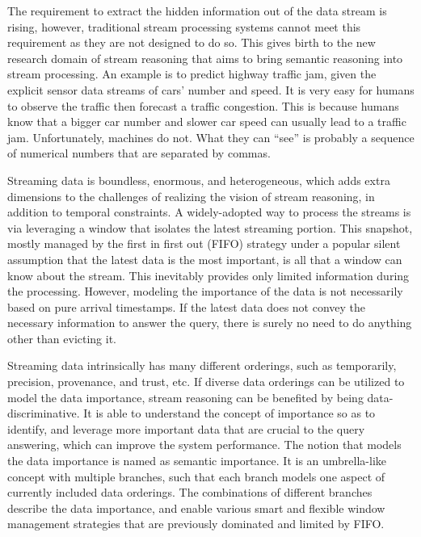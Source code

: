  
The requirement to extract the hidden information out of the data stream is rising, 
however, traditional stream processing systems cannot meet this requirement as they are not designed to do so.  
This gives birth to the new research domain of stream reasoning that aims to bring semantic reasoning into stream processing.
An example is to predict highway traffic jam, given the explicit sensor data streams of cars' number and speed.
It is very easy for humans to observe the traffic then forecast a traffic congestion.
This is because humans know that a bigger car number and slower car speed can usually lead to a traffic jam. 
Unfortunately, machines do not.
What they can ``see'' is probably a sequence of numerical numbers that are separated by commas.

Streaming data is boundless, enormous, and heterogeneous, which adds extra dimensions to the challenges of realizing the vision of stream reasoning, in addition to temporal constraints.
A widely-adopted way to process the streams is via leveraging a window that isolates the latest streaming portion. 
This snapshot, mostly managed by the first in first out (FIFO) strategy under a popular silent assumption that the latest data is the most important, is all that a window can know about the stream.
This inevitably provides only limited information during the processing.
However, modeling the importance of the data is not necessarily based on pure arrival timestamps. 
If the latest data does not convey the necessary information to answer the query, there is surely no need to do anything other than evicting it. 

Streaming data intrinsically has many different orderings, such as temporarily, precision, provenance, and trust, etc.
If diverse data orderings can be utilized to model the data importance, stream reasoning can be benefited by being data-discriminative.
It is able to understand the concept of importance so as to identify, and leverage more important data that are crucial to the query answering, which can improve the system performance.
The notion that models the data importance is named as semantic importance.
It is an umbrella-like concept with multiple branches, such that each branch models one aspect of currently included data orderings.
The combinations of different branches describe the data importance, and enable various smart and flexible window management strategies that are previously dominated and limited by FIFO.

